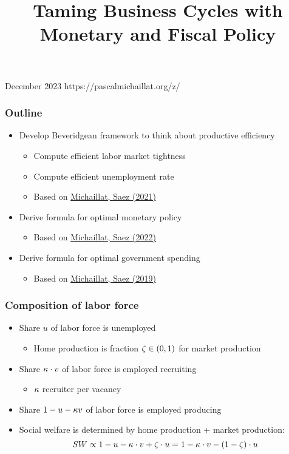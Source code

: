 \documentclass[11pt,aspectratio=169,xcolor={dvipsnames},hyperref={pdftex,pdfpagemode=UseNone,hidelinks,pdfdisplaydoctitle=true},usepdftitle=false]{beamer}
\begin{document}
\title{Taming Business Cycles with Monetary and Fiscal Policy}
%
{December 2023}%
{https://pascalmichaillat.org/z/}
\frame{\titlepage}

\begin{frame}
\frametitle{Outline}
\begin{itemize}
\item Develop Beveridgean framework to think about productive efficiency
\begin{itemize}
	\item Compute efficient labor market tightness
	\item Compute efficient unemployment rate
	\item Based on \href{https://pascalmichaillat.org/9/}{Michaillat, Saez (2021)}
\end{itemize}
\item Derive formula for optimal monetary policy
\begin{itemize}
\item Based on \href{https://pascalmichaillat.org/7/}{Michaillat, Saez (2022)}
\end{itemize}
\item Derive formula for optimal government spending
\begin{itemize}
\item Based on \href{https://pascalmichaillat.org/6/}{Michaillat, Saez (2019)}
 \end{itemize}
\end{itemize}
\end{frame}

\begin{frame}
\end{frame}

\begin{frame}
\frametitle{Composition of labor force}
\begin{itemize}
\item Share $u$ of labor force is unemployed
\begin{itemize}
	\item Home production is fraction $\zeta\in(0,1)$ for market production
\end{itemize}
\item Share $\kappa\cdot v$ of labor force is employed recruiting
\begin{itemize}
	\item $\kappa$ recruiter per vacancy
\end{itemize}
\item Share $1-u-\kappa v$ of labor force is employed producing
\item Social welfare is determined by home production + market production:
\begin{equation*}
SW \propto 1 - u - \kappa \cdot v + \zeta \cdot u = 1 - \kappa \cdot v - (1-\zeta) \cdot u 
\end{equation*}
\end{itemize}
\end{frame}
\end{document}

